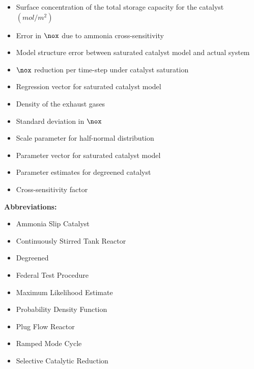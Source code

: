 \begin{itemize}[leftmargin=3.5em]
    \item[$\Gamma$] Surface concentration of the total storage capacity for the catalyst $(mol/m^2)$
    \item[$\varepsilon_\chi$] Error in $\nox$ due to ammonia cross-sensitivity
    \item[$\varepsilon_\eta$] Model structure error between saturated catalyst model and actual system
    \item[$\eta_{sat}$] $\nox$ reduction per time-step under catalyst saturation
    \item[$\phi_{sat}$] Regression vector for saturated catalyst model
    \item[$\rho$] Density of the exhaust gases
    \item[$\sigma_{\eta}$] Standard deviation in $\nox$
    \item[$\sigma$] Scale parameter for half-normal distribution
    \item[$\theta_{sat}$] Parameter vector for saturated catalyst model
    \item[$\theta_{sat}^{dg}$] Parameter estimates for degreened catalyst
    \item[$\chi$] Cross-sensitivity factor
\end{itemize}
\textbf{Abbreviations:}
\begin{itemize}[leftmargin=3.5em]
    \item[ASC] Ammonia Slip Catalyst
    \item[CSTR] Continuously Stirred Tank Reactor
    \item[DG] Degreened
    \item[FTP] Federal Test Procedure
    \item[MLE] Maximum Likelihood Estimate
    \item[PDF] Probability Density Function
    \item[PFR] Plug Flow Reactor
    \item[RMC] Ramped Mode Cycle
    \item[SCR] Selective Catalytic Reduction
\end{itemize}
